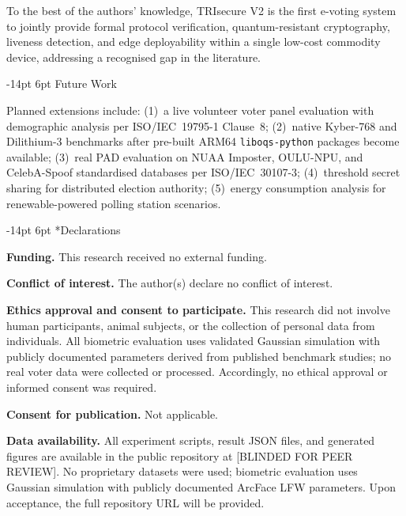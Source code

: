 \documentclass[a4paper,12pt]{article}
\makeatletter
\renewcommand\section{\@startsection{section}{1}{\z@}%
  {-14pt \@plus -4pt \@minus -2pt}{6pt \@plus 2pt}%
  {\normalfont\large\bfseries}}
\makeatother
\begin{document}
To the best of the authors' knowledge, TRIsecure V2 is the first e-voting
system to jointly provide formal protocol verification, quantum-resistant
cryptography, liveness detection, and edge deployability within a single
low-cost commodity device, addressing a recognised gap in the literature.

\section{Future Work}\label{sec:future}

Planned extensions include: (1)~a live volunteer voter panel evaluation
with demographic analysis per ISO/IEC~19795-1 Clause~8; (2)~native
Kyber-768 and Dilithium-3 benchmarks after pre-built ARM64
\texttt{liboqs-python} packages become available; (3)~real PAD evaluation
on NUAA Imposter, OULU-NPU, and CelebA-Spoof standardised databases per
ISO/IEC~30107-3; (4)~threshold secret sharing for distributed election
authority; (5)~energy consumption analysis for renewable-powered polling
station scenarios.

\section*{Declarations}

\noindent\textbf{Funding.}
This research received no external funding.

\bigskip\noindent\textbf{Conflict of interest.}
The author(s) declare no conflict of interest.

\bigskip\noindent\textbf{Ethics approval and consent to participate.}
This research did not involve human participants, animal subjects, or the
collection of personal data from individuals. All biometric evaluation uses
validated Gaussian simulation with publicly documented parameters derived
from published benchmark studies; no real voter data were collected or
processed. Accordingly, no ethical approval or informed consent was
required.

\bigskip\noindent\textbf{Consent for publication.}
Not applicable.

\bigskip\noindent\textbf{Data availability.}
All experiment scripts, result JSON files, and generated figures are
available in the public repository at [BLINDED FOR PEER REVIEW]. No
proprietary datasets were used; biometric evaluation uses Gaussian
simulation with publicly documented ArcFace LFW parameters. Upon
acceptance, the full repository URL will be provided.
\end{document}
